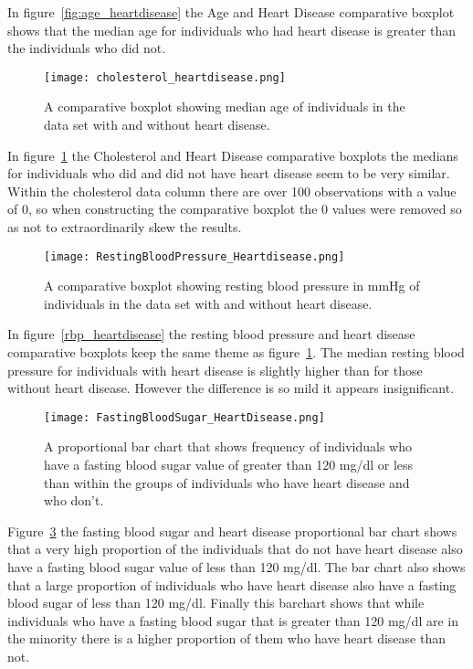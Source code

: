 \documentclass[12pt]{article}
\begin{document}
In figure~\ref{fig:age_heartdisease} the Age and Heart Disease comparative boxplot shows that the median age for individuals who had heart disease is greater than the individuals who did not. 
\begin{figure}[tbp]
  \centering
  \texttt{[image: cholesterol\_heartdisease.png]}
  \caption{A comparative boxplot showing median age of individuals in the data set with and without heart disease.}
  \label{fig:cholesterol_heartdisease}
\end{figure}
In figure~\ref{fig:cholesterol_heartdisease} the Cholesterol and Heart Disease comparative boxplots the medians for individuals who did and did not have heart disease seem to be very similar. Within the cholesterol data column there are over 100 observations with a value of 0, so when constructing the comparative boxplot the 0 values were removed so as not to extraordinarily skew the results.  
\begin{figure}[tbp]
  \centering
  \texttt{[image: RestingBloodPressure\_Heartdisease.png]}
  \caption{A comparative boxplot showing resting blood pressure in mmHg of individuals in the data set with and without heart disease.}
  \label{fig:rbp_heartdisease}
\end{figure}
In figure~\ref{rbp_heartdisease} the resting blood pressure and heart disease comparative boxplots keep the same theme as figure~\ref{fig:cholesterol_heartdisease}. The median resting blood pressure for individuals with heart disease is slightly higher than for those without heart disease. However the difference is so mild it appears insignificant. 
\begin{figure}[tbp]
  \centering
  \texttt{[image: FastingBloodSugar\_HeartDisease.png]}
  \caption{A proportional bar chart that shows frequency of individuals who have a fasting blood sugar value of greater than 120 mg/dl or less than within the groups of individuals who have heart disease and who don't.}
  \label{fig:FBS_heartdisease}
\end{figure}
Figure~\ref{fig:FBS_heartdisease} the fasting blood sugar and heart disease proportional bar chart shows that a very high proportion of the individuals that do not have heart disease also have a fasting blood sugar value of less than 120 mg/dl. The bar chart also shows that a large proportion of individuals who have heart disease also have a fasting blood sugar of less than 120 mg/dl. Finally this barchart shows that while individuals who have a fasting blood sugar that is greater than 120 mg/dl are in the minority there is a higher proportion of them who have heart disease than not. 
\end{document}
